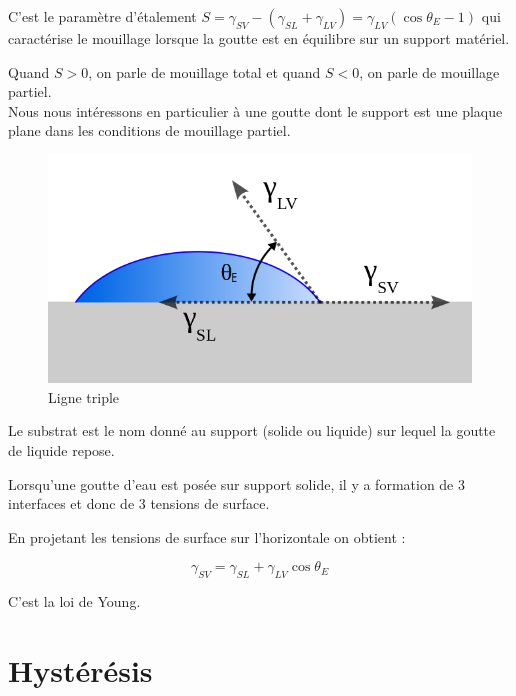 \documentclass[french]{article}
\begin{document}
C'est le paramètre d'étalement $S = \gamma_{SV} - (\gamma_{SL} + \gamma_{LV}) = \gamma_{LV}(\cos\theta_{E} - 1)$ qui caractérise le mouillage lorsque la goutte est en équilibre sur un support matériel.

Quand $S > 0$, on parle de mouillage total et quand $S < 0$, on parle de mouillage partiel.\\

Nous nous intéressons en particulier à une goutte dont le support est une plaque plane dans les conditions de mouillage partiel. 
\begin{figure}[ht]
	\centering
	\includegraphics[scale = 0.3]{./image/Contact_angle2.png}
	\caption{Ligne triple}
\end{figure}



Le substrat est le nom donné au support (solide ou liquide) sur lequel la goutte de liquide repose.

Lorsqu'une goutte d'eau est posée sur support solide, il y a formation de 3 interfaces et donc de 3 tensions de surface.


En projetant les tensions de surface sur l'horizontale on obtient :

\begin{equation}
	\label{eq:Young}
	\gamma_{SV}  = \gamma_{SL} + \gamma_{LV}\cos\theta_{E}
\end{equation}

C'est la loi de Young.

\section{Hystérésis}
\end{document}

